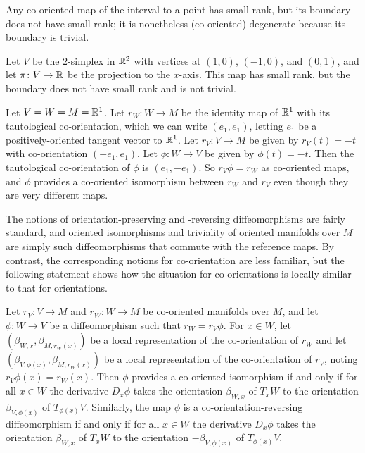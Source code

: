 \begin{example}
	Any co-oriented map of the interval to a point has small rank, but its boundary does not have small rank; it is nonetheless (co-oriented) degenerate because its boundary is trivial.
\end{example}

\begin{example}\label{E: projected triangle}
	Let $V$ be the $2$-simplex in $\mathbb{R}^2$ with vertices at $(1,0)$, $(-1,0)$, and $(0,1)$, and let $\pi \colon V \to \mathbb{R}$ be the projection to the $x$-axis.
	This map has small rank, but the boundary does not have small rank and is not trivial.
\end{example}

\begin{example}
	Let $V = W = M = \mathbb{R}^1$.
	Let $r_W \colon W \to M$ be the identity map of $\mathbb{R}^1$ with its tautological co-orientation, which we can write $(e_1,e_1)$, letting $e_1$ be a positively-oriented tangent vector to $\mathbb{R}^1$.
	Let $r_V \colon V \to M$ be given by $r_V(t) = -t$ with co-orientation $(-e_1,e_1)$.
	Let $\phi \colon W \to V$ be given by $\phi(t) = -t$.
	Then the tautological co-orientation of $\phi$ is $(e_1,-e_1)$.
	So $r_V\phi = r_W$ as co-oriented maps, and $\phi$ provides a co-oriented isomorphism between $r_W$ and $r_V$ even though they are very different maps.
\end{example}

The notions of orientation-preserving and -reversing diffeomorphisms are fairly standard, and oriented isomorphisms and triviality of oriented manifolds over $M$ are simply such diffeomorphisms that commute with the reference maps.
By contrast, the corresponding notions for co-orientation are less familiar, but the following statement shows how the situation for co-orientations is locally similar to that for orientations.

\begin{lemma}\label{L: co-or preserving/reversing}
	Let $r_V \colon V \to M$ and $r_W \colon W \to M$ be co-oriented manifolds over $M$, and let $\phi \colon W \to V$ be a diffeomorphism such that $r_W = r_V \phi$.
	For $x \in W$, let $(\beta_{W,x},\beta_{M,r_W(x)})$ be a local representation of the co-orientation of $r_W$ and let $(\beta_{V, \phi(x)},\beta_{M,r_W(x)})$  be a local representation of the co-orientation of $r_V$,  noting $r_V\phi(x)=r_W(x)$.
	Then $\phi$ provides a co-oriented isomorphism if and only if for all $x\in W$ the derivative $D_x\phi$ takes the orientation $\beta_{W,x}$ of $T_xW$ to the orientation $\beta_{V, \phi(x)}$ of $T_{\phi(x)}V$.
	Similarly, the map $\phi$ is a co-orientation-reversing diffeomorphism if and only if for all $x\in W$ the derivative $D_x\phi$ takes the orientation $\beta_{W,x}$ of $T_xW$ to the orientation $-\beta_{V, \phi(x)}$ of $T_{\phi(x)}V$.
\end{lemma}

